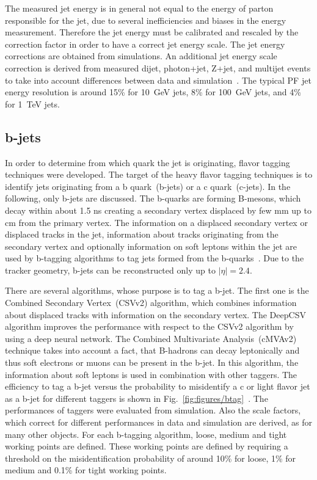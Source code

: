 The measured jet energy is in general not equal to the energy of parton responsible for the jet, due to several inefficiencies and biases in the energy measurement. Therefore the jet energy must be calibrated and rescaled by the correction factor in order to have a correct jet energy scale. The jet energy corrections are obtained from simulations. An additional jet energy scale correction is derived from measured dijet, photon+jet, Z+jet, and multijet events to take into account differences between data and simulation~\cite{Khachatryan:2016kdb}. The typical PF jet energy resolution is around 15\% for 10~GeV jets, 8\% for 100~GeV jets, and 4\% for 1~TeV jets. %

\subsection{b-jets}

In order to determine from which quark the jet is originating, flavor tagging techniques were developed. The target of the heavy flavor tagging techniques is to identify jets originating from a b quark~(b-jets) or a c quark~(c-jets). In the following, only b-jets are discussed. The b-quarks are forming B-mesons, which decay within about 1.5 ns creating a secondary vertex  displaced by few mm up to cm from the primary vertex. The information on a displaced secondary vertex or displaced tracks in the jet, information about tracks originating from the secondary vertex and optionally information on soft leptons within the jet are used by b-tagging algorithms to tag jets formed from the b-quarks~\cite{Sirunyan:2017ezt}. Due to the tracker geometry, b-jets can be reconstructed only up to $|\eta|=2.4$.

There are several algorithms, whose purpose is to tag a b-jet. The first one is the Combined Secondary Vertex~(CSVv2) algorithm, which combines information about displaced tracks with information on the secondary vertex. The DeepCSV algorithm improves the performance with respect to the CSVv2 algorithm by using a deep neural network. The Combined Multivariate Analysis~(cMVAv2) technique takes into account a fact, that B-hadrons can decay leptonically and thus soft electrons or muons can be present in the b-jet. In this algorithm, the information about soft leptons is used in combination with other taggers. The efficiency to tag a b-jet versus the probability to misidentify a c or light flavor jet as a b-jet for different taggers is shown in Fig.~\ref{fig:figures/btag}~\cite{Sirunyan:2017ezt}. The performances of taggers were evaluated from simulation. Also the scale factors, which correct for different performances in data and simulation are derived, as for many other objects. For each b-tagging algorithm, loose, medium and tight working points are defined. These working points are defined by requiring a threshold on the misidentification probability of around 10\% for loose, 1\% for medium and 0.1\% for tight working points.


